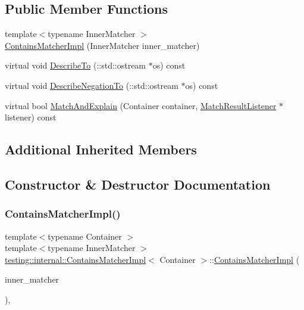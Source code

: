 \subsection*{Public Member Functions}
\begin{DoxyCompactItemize}
\item 
{\footnotesize template$<$typename Inner\+Matcher $>$ }\\\hyperlink{classtesting_1_1internal_1_1_contains_matcher_impl_a3fd56f21081068101a76ebe05fc1d7f4}{Contains\+Matcher\+Impl} (Inner\+Matcher inner\+\_\+matcher)
\item 
virtual void \hyperlink{classtesting_1_1internal_1_1_contains_matcher_impl_af47e4e9f890d64e7f8abcdf3f5fb8b3e}{Describe\+To} (\+::std\+::ostream $\ast$os) const
\item 
virtual void \hyperlink{classtesting_1_1internal_1_1_contains_matcher_impl_a9d7867110ba3f346399f23e41cc75c5b}{Describe\+Negation\+To} (\+::std\+::ostream $\ast$os) const
\item 
virtual bool \hyperlink{classtesting_1_1internal_1_1_contains_matcher_impl_a1cb9f1d2da48bd4a48c281215f8f94e9}{Match\+And\+Explain} (Container container, \hyperlink{classtesting_1_1_match_result_listener}{Match\+Result\+Listener} $\ast$listener) const
\end{DoxyCompactItemize}
\subsection*{Additional Inherited Members}


\subsection{Constructor \& Destructor Documentation}
\mbox{\label{classtesting_1_1internal_1_1_contains_matcher_impl_a3fd56f21081068101a76ebe05fc1d7f4}} 
\subsubsection{\texorpdfstring{Contains\+Matcher\+Impl()}{ContainsMatcherImpl()}}
{\footnotesize\ttfamily template$<$typename Container $>$ \\
template$<$typename Inner\+Matcher $>$ \\
\hyperlink{classtesting_1_1internal_1_1_contains_matcher_impl}{testing\+::internal\+::\+Contains\+Matcher\+Impl}$<$ Container $>$\+::\hyperlink{classtesting_1_1internal_1_1_contains_matcher_impl}{Contains\+Matcher\+Impl} (\begin{DoxyParamCaption}\item[{Inner\+Matcher}]{inner\+\_\+matcher }\end{DoxyParamCaption})\hspace{0.3cm}{\ttfamily [inline]}, {\ttfamily [explicit]}}



